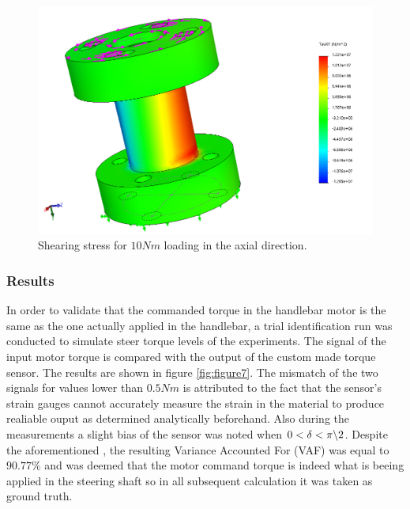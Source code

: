 \begin{figure}[h]
\centering
\captionsetup{justification=centering,margin=2cm}

\includegraphics[scale=0.6]{images/sensor_shear_SW.png}
	\caption[Short title]{Shearing stress for \ensuremath{10 Nm} loading in the axial direction.}
\label{fig:figure6}
\end{figure}

\subsubsection{Results}
In order to validate that the commanded torque in the handlebar motor is the same as the one actually applied in the handlebar, a trial identification run was conducted to simulate steer torque levels of the experiments. The signal of the input motor torque is compared with the output of the custom made torque sensor. The results are shown in figure \ref{fig:figure7}. The mismatch of the two signals for values lower than \ensuremath{0.5 Nm} is attributed to the fact that the sensor's strain gauges cannot accurately measure the strain in the material to produce realiable ouput as determined analytically beforehand. Also during the measurements a slight bias of the sensor was noted when  \ensuremath{0<\delta<\pi \char`\\
2}. Despite the aforementioned , the resulting Variance Accounted For (VAF) was equal to \ensuremath{90.77 \%} and was deemed that the motor command torque  is indeed what is beeing applied in the steering shaft so in all subsequent calculation it was taken as ground truth.

